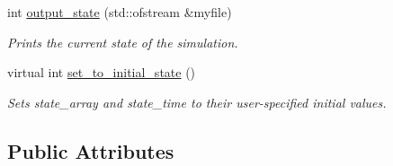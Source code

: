 \begin{DoxyCompactItemize}
int \hyperlink{class_realization_ab7ef90279eef4bf11261084f541c7bb0}{output\+\_\+state} (std\+::ofstream \&myfile)
\begin{DoxyCompactList}\small\item\em Prints the current state of the simulation. \end{DoxyCompactList}\item 
virtual int \hyperlink{class_realization_a391a89af7574a9053f53f8a299c2cc70}{set\+\_\+to\+\_\+initial\+\_\+state} ()
\begin{DoxyCompactList}\small\item\em Sets state\+\_\+array and state\+\_\+time to their user-\/specified initial values. \end{DoxyCompactList}\end{DoxyCompactItemize}
\subsection*{Public Attributes}
